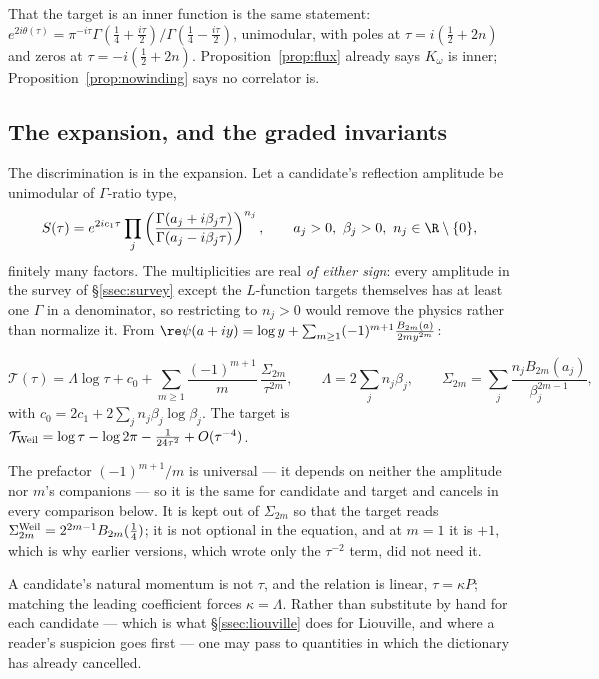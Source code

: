 That the target is an inner function is the same statement:
$e^{2i\theta(\tau)}=\pi^{-i\tau}\Gamma(\frac14+\frac{i\tau}2)/
\Gamma(\frac14-\frac{i\tau}2)$, unimodular, with poles at $\tau=i(\frac12+2n)$ and
zeros at $\tau=-i(\frac12+2n)$. Proposition~\ref{prop:flux} already says
$K_\omega$ is inner; Proposition~\ref{prop:nowinding} says no correlator is.

\subsection{The expansion, and the graded invariants}\label{ssec:invariants}

The discrimination is in the expansion. Let a candidate's reflection amplitude be
unimodular of $\Gamma$-ratio type,
\begin{equation}\label{eq:gammaratio}
 S(\tau)=e^{2ic_1\tau}\prod_j
 \left(\frac{\Gamma(a_j+i\beta_j\tau)}{\Gamma(a_j-i\beta_j\tau)}\right)^{n_j},
 \qquad a_j>0,\ \beta_j>0,\ n_j\in\R\setminus\{0\},
\end{equation}
finitely many factors. The multiplicities are real \emph{of either sign}: every
amplitude in the survey of \S\ref{ssec:survey} except the $L$-function targets
themselves has at least one $\Gamma$ in a denominator, so restricting to $n_j>0$
would remove the physics rather than normalize it. From
$\re\psi(a+iy)=\log y+\sum_{m\geq1}(-1)^{m+1}\frac{B_{2m}(a)}{2my^{2m}}$:

\begin{proposition}\label{prop:expansion}
\[
 \mathcal T(\tau)=\Lambda\log\tau+c_0
 +\sum_{m\geq1}\frac{(-1)^{m+1}}{m}\,\frac{\Sigma_{2m}}{\tau^{2m}},
 \qquad \Lambda=2\sum_jn_j\beta_j,\qquad
 \Sigma_{2m}=\sum_j\frac{n_jB_{2m}(a_j)}{\beta_j^{2m-1}},
\]
with $c_0=2c_1+2\sum_jn_j\beta_j\log\beta_j$. The target is
$\mathcal T_{\rm Weil}=\log\tau-\log2\pi-\frac1{24\tau^2}+O(\tau^{-4})$.
\end{proposition}

The prefactor $(-1)^{m+1}/m$ is universal --- it depends on neither the amplitude
nor $m$'s companions --- so it is the same for candidate and target and cancels in
every comparison below. It is kept out of $\Sigma_{2m}$ so that the target reads
$\Sigma_{2m}^{\rm Weil}=2^{2m-1}B_{2m}(\frac14)$; it is not optional in the
equation, and at $m=1$ it is $+1$, which is why earlier versions, which wrote only
the $\tau^{-2}$ term, did not need it.

A candidate's natural momentum is not $\tau$, and the relation is linear,
$\tau=\kappa P$; matching the leading coefficient forces $\kappa=\Lambda$. Rather
than substitute by hand for each candidate --- which is what \S\ref{ssec:liouville}
does for Liouville, and where a reader's suspicion goes first --- one may pass to
quantities in which the dictionary has already cancelled.

